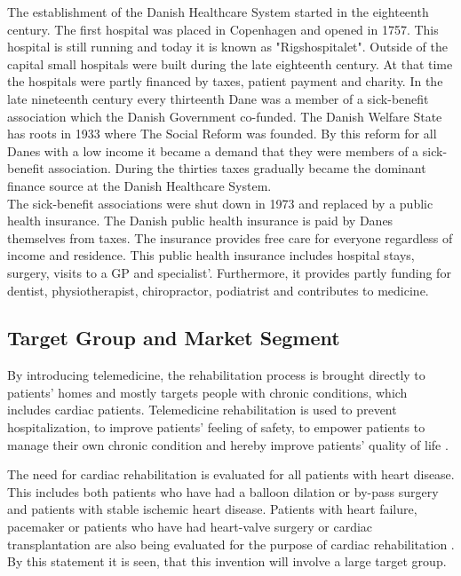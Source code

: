 The establishment of the Danish Healthcare System started in the eighteenth century. The first hospital was placed in Copenhagen and opened in 1757. This hospital is still running and today it is known as "Rigshospitalet". Outside of the capital small hospitals were built during the late eighteenth century. At that time the hospitals were partly financed by taxes, patient payment and charity. In the late nineteenth century every thirteenth Dane was a member of a sick-benefit association which the Danish Government co-funded. The Danish Welfare State has roots in 1933 where The Social Reform was founded. By this reform for all Danes with a low income it became a demand that they were members of a sick-benefit association. During the thirties taxes gradually became the dominant finance source at the Danish Healthcare System.\\ 
The sick-benefit associations were shut down in 1973 and replaced by a public health insurance. The Danish public health insurance is paid by Danes themselves from taxes. The insurance provides free care for everyone regardless of income and residence. This public health insurance includes hospital stays, surgery, visits to a GP and specialist'. Furthermore, it provides partly funding for dentist, physiotherapist, chiropractor, podiatrist and contributes to medicine.   \\


\subsection{Target Group and Market Segment}

By introducing telemedicine, the rehabilitation process is brought directly to patients' homes and mostly targets people with chronic conditions, which includes cardiac patients. Telemedicine rehabilitation is used to prevent hospitalization, to improve patients' feeling of safety, to empower patients to manage their own chronic condition and hereby improve patients' quality of life \cite{Emergence}. 

The need for cardiac rehabilitation is evaluated for all patients with heart disease. This includes both patients who have had a balloon dilation or by-pass surgery and patients with stable ischemic heart disease.
Patients with heart failure, pacemaker or patients who have had heart-valve surgery or cardiac transplantation are also being evaluated for the purpose of cardiac rehabilitation \cite{Rehabilitering}. By this statement it is seen, that this invention will involve a large target group.

